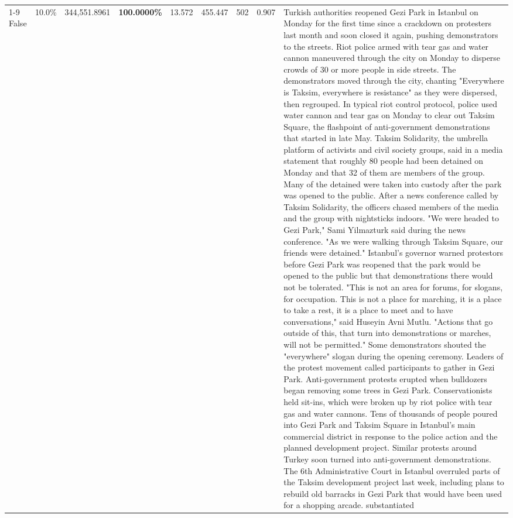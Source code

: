 \begin{table}[H]
\begin{tabular}{lllrlllll}
\cline{1-9}
False & 10.0\% & 344,551.8961 & \bfseries \color{red} 100.0000\% & 13.572 & 455.447 & 502 & 0.907 & Turkish authorities reopened Gezi Park in Istanbul on Monday for the first time since a crackdown on protesters last month and soon closed it again, pushing demonstrators to the streets. Riot police armed with tear gas and water cannon maneuvered through the city on Monday to disperse crowds of 30 or more people in side streets. The demonstrators moved through the city, chanting "Everywhere is Taksim, everywhere is resistance" as they were dispersed, then regrouped. In typical riot control protocol, police used water cannon and tear gas on Monday to clear out Taksim Square, the flashpoint of anti-government demonstrations that started in late May. Taksim Solidarity, the umbrella platform of activists and civil society groups, said in a media statement that roughly 80 people had been detained on Monday and that 32 of them are members of the group. Many of the detained were taken into custody after the park was opened to the public. After a news conference called by Taksim Solidarity, the officers chased members of the media and the group with nightsticks indoors. "We were headed to Gezi Park," Sami Yilmazturk said during the news conference. "As we were walking through Taksim Square, our friends were detained." Istanbul's governor warned protestors before Gezi Park was reopened that the park would be opened to the public but that demonstrations there would not be tolerated. "This is not an area for forums, for slogans, for occupation. This is not a place for marching, it is a place to take a rest, it is a place to meet and to have conversations," said Huseyin Avni Mutlu. "Actions that go outside of this, that turn into demonstrations or marches, will not be permitted." Some demonstrators shouted the "everywhere" slogan during the opening ceremony. Leaders of the protest movement called participants to gather in Gezi Park. Anti-government protests erupted when bulldozers began removing some trees in Gezi Park. Conservationists held sit-ins, which were broken up by riot police with tear gas and water cannons. Tens of thousands of people poured into Gezi Park and Taksim Square in Istanbul's main commercial district in response to the police action and the planned development project. Similar protests around Turkey soon turned into anti-government demonstrations. The 6th Administrative Court in Istanbul overruled parts of the Taksim development project last week, including plans to rebuild old barracks in Gezi Park that would have been used for a shopping arcade. substantiated \\

\end{tabular}
\end{table}
